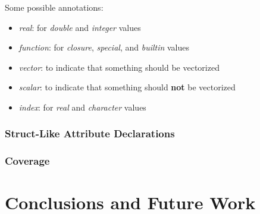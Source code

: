 Some possible annotations:

\begin{itemize}
    \item \textit{real}: for \textit{double} and \textit{integer} values
    \item \textit{function}: for \textit{closure}, \textit{special}, and \textit{builtin} values
    \item \textit{vector}: to indicate that something should be vectorized
    \item \textit{scalar}: to indicate that something should \textbf{not} be vectorized
    \item \textit{index}: for \textit{real} and \textit{character} values
\end{itemize}

%
%
\subsubsection{Struct-Like Attribute Declarations}


%
%
\subsubsection{Coverage}


%
%
%
%
%
%
\section{Conclusions and Future Work}